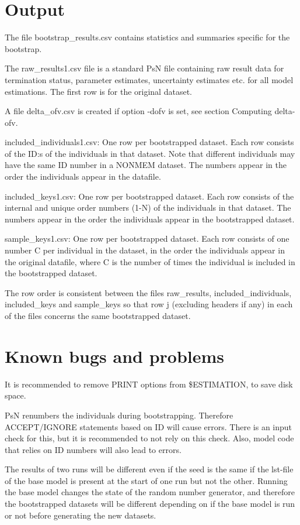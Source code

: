 \section{Output}

The file bootstrap\_results.csv contains statistics and summaries specific for the bootstrap.

The raw\_results1.csv file is a standard PsN file containing raw result data for termination status, parameter estimates, uncertainty estimates etc. for all model estimations. The first row is for the original dataset.

A file delta\_ofv.csv is created if option -dofv is set, see section Computing delta-ofv.

included\_individuals1.csv: One row per bootstrapped dataset. Each row consists of the ID:s of the individuals in that dataset. Note that different individuals may have the same ID number in a NONMEM dataset. The numbers appear in the order the individuals appear in the datafile.

included\_keys1.csv: One row per bootstrapped dataset. Each row consists of the internal and unique order numbers (1-N) of the individuals in that dataset. The numbers appear in the order the individuals appear in the bootstrapped dataset. 

sample\_keys1.csv:  One row per bootstrapped dataset. Each row consists of one number C per individual in the dataset, in the order the individuals appear in the original datafile, where C is the number of times the individual is included in the bootstrapped dataset. 

The row order is consistent between the files raw\_results, included\_individuals, included\_keys and sample\_keys so that row j (excluding headers if any) in each of the files concerns the same bootstrapped dataset.

\section{Known bugs and problems}

It is recommended to remove PRINT options from \$ESTIMATION, to save disk space.

PsN renumbers the individuals during bootstrapping. Therefore ACCEPT/IGNORE statements based on ID will cause errors. 
There is an input check for this, but it is recommended to not rely on this check. Also, model code that relies on ID numbers will also lead to
errors.

The results of two runs will be different even if the seed is the same if the lst-file of the base model is present at the start of one run but not the other. Running the base model changes the state of the random number generator, and therefore the bootstrapped datasets will be different depending on if the base model is run or not before generating the  new datasets. 

